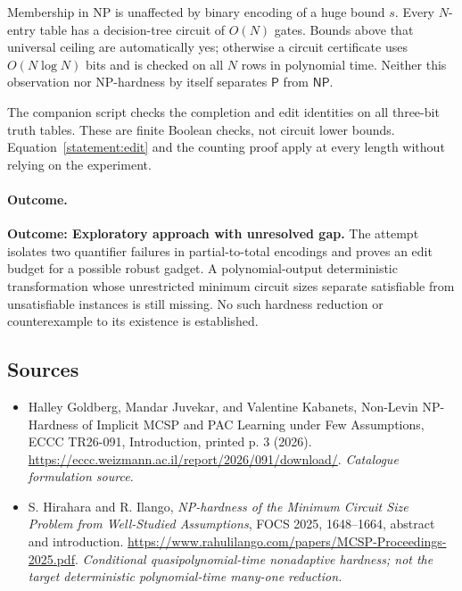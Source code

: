 \documentclass[11pt,a4paper]{article}
\numberwithin{equation}{section}
\begin{document}
Membership in NP is unaffected by binary encoding of a huge bound $s$.
Every $N$-entry table has a decision-tree circuit of $O(N)$ gates. Bounds
above that universal ceiling are automatically yes; otherwise a circuit
certificate uses $O(N\log N)$ bits and is checked on all $N$ rows in
polynomial time. Neither this observation nor NP-hardness by itself
separates $\mathsf P$ from $\mathsf{NP}$.

The companion script checks the completion and edit identities on all
three-bit truth tables. These are finite Boolean checks, not circuit lower
bounds. Equation~\eqref{statement:edit} and the counting proof apply at every
length without relying on the experiment.

\paragraph{Outcome.}
\textbf{Outcome: Exploratory approach with unresolved gap.}
The attempt isolates two quantifier failures in partial-to-total encodings
and proves an edit budget for a possible robust gadget. A polynomial-output
deterministic transformation whose unrestricted minimum circuit sizes
separate satisfiable from unsatisfiable instances is still missing. No such
hardness reduction or counterexample to its existence is established.

\subsection{Sources}
\begin{itemize}\raggedright
\item[\textnormal{[S1]}]\hypertarget{source:statement:1}{} Halley Goldberg, Mandar Juvekar, and Valentine Kabanets, Non-Levin NP-Hardness of Implicit MCSP and PAC Learning under Few Assumptions, ECCC TR26-091, Introduction, printed p. 3 (2026).
\url{https://eccc.weizmann.ac.il/report/2026/091/download/}.
{\small\textit{Catalogue formulation source.}}
\item[\textnormal{[E1]}]\hypertarget{extra:statement:1}{} S. Hirahara and R. Ilango,
\emph{NP-hardness of the Minimum Circuit Size Problem from Well-Studied
Assumptions}, FOCS 2025, 1648--1664, abstract and introduction.
\url{https://www.rahulilango.com/papers/MCSP-Proceedings-2025.pdf}.
{\small\textit{Conditional quasipolynomial-time nonadaptive hardness;
not the target deterministic polynomial-time many-one reduction.}}

\end{itemize}
\end{document}
